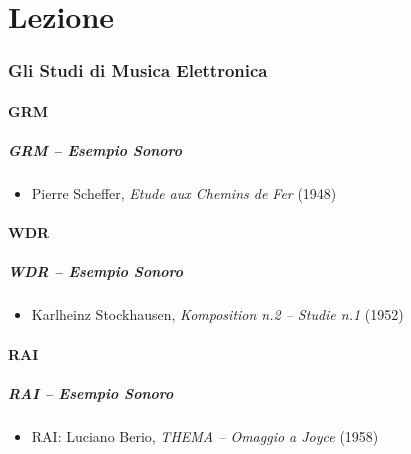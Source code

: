 \documentclass[\printmode,compress,xcolor=dvipsnames]{beamer}
\begin{document}
\part{Lezione }
\section[Musica Elettronica]{Gli Studi di Musica Elettronica}
\subsection{GRM}
\begin{frame}
    \frametitle{GRM -- Esempio Sonoro}

    \begin{itemize}

        \item Pierre Scheffer, \emph{Etude aux Chemins de Fer} (1948)

    \end{itemize}

\end{frame}
\subsection{WDR}
\begin{frame}
    \frametitle{WDR -- Esempio Sonoro}

    \begin{itemize}

        \item Karlheinz Stockhausen, \emph{Komposition n.2 -- Studie n.1} (1952)

    \end{itemize}

\end{frame}
\subsection{RAI}
\begin{frame}
    \frametitle{RAI -- Esempio Sonoro}

    \begin{itemize}

        \item RAI: Luciano Berio, \emph{THEMA -- Omaggio a Joyce} (1958)

    \end{itemize}

\end{frame}
\end{document}
